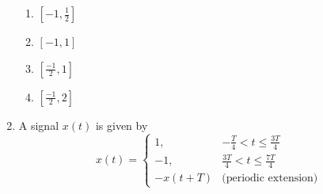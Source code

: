 \documentclass[journal,12pt,twocolumn]{IEEEtran}
\theoremstyle{remark}
\begin{document}
\begin{enumerate}
\begin{multicols}{2}
\begin{enumerate}
    \item $[-1,\frac{1}{2}]$
    \item $[-1,1]$
    \item $[\frac{-1}{2},1]$
    \item $[\frac{-1}{2},2]$
\end{enumerate}
\end{multicols}
\item A signal \(x(t)\) is given by
\[
x(t) =
\begin{cases}
1, & -\frac{T}{4} < t \leq \frac{3T}{4} \\
-1, & \frac{3T}{4} < t \leq \frac{7T}{4} \\
-x(t + T) & \text{(periodic extension)}
\end{cases}
\]


\end{enumerate}
\end{document}
